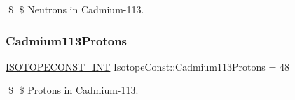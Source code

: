 \$ \$ Neutrons in Cadmium-\/113. \mbox{\label{group___isotope_const-_cadmium-_cd113_ga918b8fc80c34c7f866ca292e0e08522b}} 
\subsubsection{\texorpdfstring{Cadmium113\+Protons}{Cadmium113Protons}}
{\footnotesize\ttfamily \mbox{\hyperlink{group___isotope_const-_macros_ga5f18360b3e99483a35c32d789e62621c}{I\+S\+O\+T\+O\+P\+E\+C\+O\+N\+S\+T\+\_\+\+I\+NT}} Isotope\+Const\+::\+Cadmium113\+Protons = 48}

\$ \$ Protons in Cadmium-\/113. 